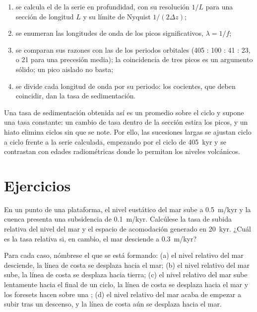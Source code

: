 \begin{method}\label{met:b3:sequence-stratigraphy:cycles}
\begin{enumerate}
\item se calcula el  de la serie en profundidad, con su resolución
  $1/L$ para una sección de longitud $L$ y su límite de Nyquist $1/(2\Delta z)$;
\item se enumeran las longitudes de onda de los picos significativos, $\lambda = 1/f$;
\item se comparan sus razones con las de los periodos orbitales (405 : 100 : 41
  : 23, o 21 para una precesión media); la coincidencia de tres picos es un
  argumento sólido; un pico aislado no basta;
\item se divide cada longitud de onda por su periodo: los cocientes, que deben
  coincidir, dan la tasa de sedimentación.
\end{enumerate}
\end{method}

Una tasa de sedimentación obtenida así es un promedio sobre el ciclo y
supone una tasa constante: un cambio de tasa dentro de la sección estira los
picos, y un hiato elimina ciclos sin que se note. Por ello, las sucesiones largas se ajustan
ciclo a ciclo frente a la serie calculada, empezando por el ciclo de \qty{405}{kyr}
y se contrastan con edades radiométricas donde lo permitan los niveles volcánicos.

\section{Ejercicios}

\begin{exercise}[$\star$]\label{exo:b3:sequence-stratigraphy:1}
En un punto de una plataforma, el nivel eustático del mar sube a \qty{0.5}{m/kyr} y
la cuenca presenta una subsidencia de \qty{0.1}{m/kyr}. Calcúlese la tasa de
subida relativa del nivel del mar y el espacio de acomodación generado en \qty{20}{kyr}.
¿Cuál es la tasa relativa si, en cambio, el mar desciende a \qty{0.3}{m/kyr}?
\end{exercise}

\begin{exercise}[$\star$]\label{exo:b3:sequence-stratigraphy:2}
Para cada caso, nómbrese el  que se está formando: (a) el nivel relativo del mar
desciende, la línea de costa se desplaza hacia el mar; (b) el nivel relativo del mar sube, la
línea de costa se desplaza hacia tierra; (c) el nivel relativo del mar sube lentamente hacia el final de un
ciclo, la línea de costa se desplaza hacia el mar y los foresets hacen  sobre una ; (d) el nivel relativo del mar acaba de empezar a subir tras
un descenso, y la línea de costa aún se desplaza hacia el mar.
\end{exercise}

